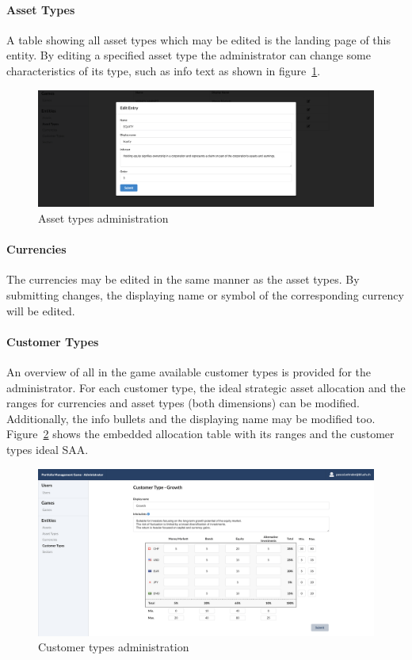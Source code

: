 \paragraph{Asset Types}
A table showing all asset types which may be edited is the landing page of this entity. By editing a specified asset type the administrator can change some characteristics of its type, such as info text as shown in figure~\ref{fig:asset_types}.
\begin{figure}[h!]
  \centering
  \includegraphics[scale=0.2]{img/application-overview/administrator/entities_asset_types.png}
  \caption{Asset types administration}
  \label{fig:asset_types}
\end{figure}

\paragraph{Currencies}
The currencies may be edited in the same manner as the asset types. By submitting changes, the displaying name or symbol of the corresponding currency will be edited.

\paragraph{Customer Types}
An overview of all in the game available customer types is provided for the administrator. For each customer type, the ideal strategic asset allocation and the ranges for currencies and asset types (both dimensions) can be modified. Additionally, the info bullets and the displaying name may be modified too. Figure~\ref{fig:customer_types} shows the embedded allocation table with its ranges and the customer types ideal SAA.
\begin{figure}[h!]
  \centering
  \includegraphics[scale=0.2]{img/application-overview/administrator/entities_customer_types.png}
  \caption{Customer types administration}
  \label{fig:customer_types}
\end{figure}


